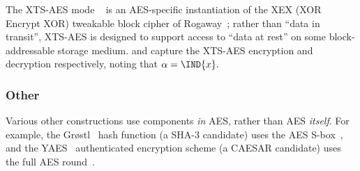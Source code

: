 The XTS-AES mode 
~\cite{NIST:sp.800.38e}
is an AES-specific instantiation of the XEX (XOR Encrypt XOR) tweakable
block cipher of Rogaway~\cite{Rogaway:04};
rather than ``data in transit'', XTS-AES is designed to support access
to ``data at rest'' on some block-addressable storage medium.
and
capture the XTS-AES encryption and decryption respectively, noting that 
$
\alpha = \IND{x} .
$


\subsubsection{Other}

Various other constructions use components {\em in} AES, rather than AES
{\em itself}.
For example,
the Gr{\o}stl~\cite{GKMMRST:11} hash function
(a SHA-3  candidate)
uses the AES S-box~\cite[Section 4.3]{GKMMRST:11},
and
the YAES~\cite{BosVer:14} authenticated encryption scheme
(a CAESAR candidate)
uses the full AES round~\cite[Section 1.3]{BosVer:14}.

